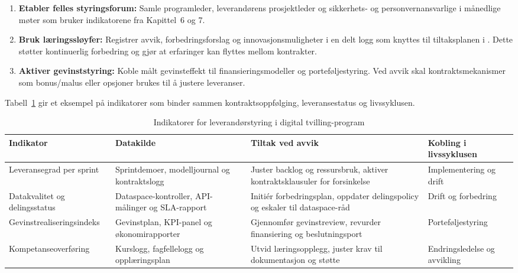 \begin{enumerate}
    \item \textbf{Etabler felles styringsforum:} Samle programleder, leverandørens prosjektleder og sikkerhets- og personvernansvarlige
    i månedlige møter som bruker indikatorene fra Kapittel~6 og 7.
    \item \textbf{Bruk læringssløyfer:} Registrer avvik, forbedringsforslag og innovasjonsmuligheter i en delt logg som knyttes til
    tiltaksplanen i \citet{ks2023leverandor}. Dette støtter kontinuerlig forbedring og gjør at erfaringer kan flyttes mellom kontrakter.
    \item \textbf{Aktiver gevinststyring:} Koble målt gevinsteffekt til finansieringsmodeller og porteføljestyring. Ved avvik
    skal kontraktsmekanismer som bonus/malus eller opsjoner brukes til å justere leveranser.
\end{enumerate}

Tabell~\ref{tab:leverandoroppfolging} gir et eksempel på indikatorer som binder sammen kontraktsoppfølging, leveransestatus og livssyklusen.

\begin{table}[h]
    \centering
    \caption{Indikatorer for leverandørstyring i digital tvilling-program}
    \label{tab:leverandoroppfolging}
    \begin{tabular}{|p{3.2cm}|p{4.5cm}|p{4.2cm}|p{3.0cm}|}
        \hline
        \textbf{Indikator} & \textbf{Datakilde} & \textbf{Tiltak ved avvik} & \textbf{Kobling i livssyklusen} \\
        \hline
        Leveransegrad per sprint & Sprintdemoer, modelljournal og kontraktslogg & Juster backlog og ressursbruk, aktiver kontraktsklausuler for forsinkelse & Implementering og drift \\
        \hline
        Datakvalitet og delingsstatus & Dataspace-kontroller, API-målinger og SLA-rapport & Initiér forbedringsplan, oppdater delingspolicy og eskaler til dataspace-råd & Drift og forbedring \\
        \hline
        Gevinstrealiseringsindeks & Gevinstplan, KPI-panel og økonomirapporter & Gjennomfør gevinstreview, revurder finansiering og beslutningsport & Porteføljestyring \\
        \hline
        Kompetanseoverføring & Kurslogg, fagfellelogg og opplæringsplan & Utvid læringsopplegg, juster krav til dokumentasjon og støtte & Endringsledelse og avvikling \\
        \hline
    \end{tabular}
\end{table}

